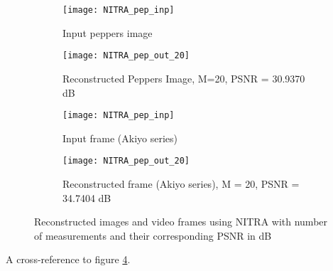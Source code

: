 \documentclass[demo]{article} %
\begin{document}
\begin{figure}[!t]
\centering
\begin{subfigure}[t]{4.5cm}
\texttt{[image: NITRA\_pep\_inp]} 
\caption{Input peppers image}
\label{cari1}
\end{subfigure}
\qquad %
\begin{subfigure}[t]{4.5cm}
\texttt{[image: NITRA\_pep\_out\_20]}
\caption{Reconstructed Peppers Image, M=20, PSNR = 30.9370 dB} 
\label{caro1}
\end{subfigure}

\vspace{\baselineskip}

\begin{subfigure}[t]{4.5cm}
\texttt{[image: NITRA\_pep\_inp]}
\caption{Input frame (Akiyo series)}
\label{aki1}
\end{subfigure} 
\qquad %
\begin{subfigure}[t]{4.5cm}
\texttt{[image: NITRA\_pep\_out\_20]}
\caption{Reconstructed frame (Akiyo series), M = 20, PSNR = 34.7404 dB} 
\label{akio2}
\end{subfigure}

\caption{Reconstructed images and video frames using NITRA with 
number of measurements and their corresponding PSNR in dB}
\label{NITRAres1} 
\end{figure}

A cross-reference to figure \ref{akio2}.
\end{document}
